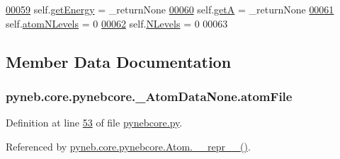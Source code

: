 \begin{DoxyCode}
\hypertarget{classpyneb_1_1core_1_1pynebcore_1_1___atom_data_none_l00059}{}\hyperlink{classpyneb_1_1core_1_1pynebcore_1_1___atom_data_none_ace59c545d211f79753ebdc9414eb1824}{00059}         self.\hyperlink{classpyneb_1_1core_1_1pynebcore_1_1___atom_data_none_ace59c545d211f79753ebdc9414eb1824}{getEnergy} = \_returnNone
\hypertarget{classpyneb_1_1core_1_1pynebcore_1_1___atom_data_none_l00060}{}\hyperlink{classpyneb_1_1core_1_1pynebcore_1_1___atom_data_none_a44aa15dc5314c07627944e86581631b1}{00060}         self.\hyperlink{classpyneb_1_1core_1_1pynebcore_1_1___atom_data_none_a44aa15dc5314c07627944e86581631b1}{getA} = \_returnNone
\hypertarget{classpyneb_1_1core_1_1pynebcore_1_1___atom_data_none_l00061}{}\hyperlink{classpyneb_1_1core_1_1pynebcore_1_1___atom_data_none_a3bc65b4742319ce5123d6fd3ca977c63}{00061}         self.\hyperlink{classpyneb_1_1core_1_1pynebcore_1_1___atom_data_none_a3bc65b4742319ce5123d6fd3ca977c63}{atomNLevels} = 0
\hypertarget{classpyneb_1_1core_1_1pynebcore_1_1___atom_data_none_l00062}{}\hyperlink{classpyneb_1_1core_1_1pynebcore_1_1___atom_data_none_a784a8906a9fd1b408b567989207aca84}{00062}         self.\hyperlink{classpyneb_1_1core_1_1pynebcore_1_1___atom_data_none_a784a8906a9fd1b408b567989207aca84}{NLevels} = 0
00063 
\end{DoxyCode}


\subsection{Member Data Documentation}
\hypertarget{classpyneb_1_1core_1_1pynebcore_1_1___atom_data_none_a0b4acd0c49278c6b3ac0fa460ad33bb9}{}
\subsubsection[{atom\+File}]{\setlength{\rightskip}{0pt plus 5cm}pyneb.\+core.\+pynebcore.\+\_\+\+Atom\+Data\+None.\+atom\+File}\label{classpyneb_1_1core_1_1pynebcore_1_1___atom_data_none_a0b4acd0c49278c6b3ac0fa460ad33bb9}


Definition at line \hyperlink{pynebcore_8py_source_l00053}{53} of file \hyperlink{pynebcore_8py_source}{pynebcore.\+py}.



Referenced by \hyperlink{pynebcore_8py_source_l02544}{pyneb.\+core.\+pynebcore.\+Atom.\+\_\+\+\_\+repr\+\_\+\+\_\+()}.

